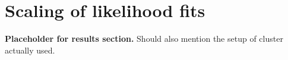 \section{Scaling of likelihood fits}\label{sec:results}

\textbf{Placeholder for results section.}
Should also mention the setup of cluster actually used.
